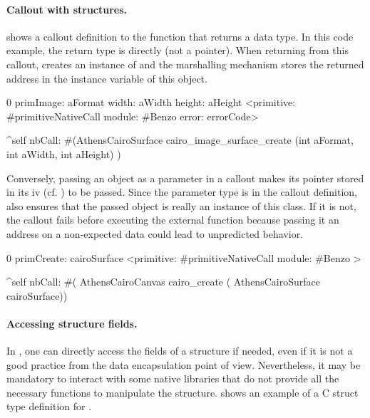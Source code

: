 \paragraph{Callout with structures.}
 shows a callout definition to the  function that returns a  data type.
In this code example, the return type is  directly (not a pointer).
When returning from this callout, \NB creates an instance of  and the marshalling mechanism  stores the returned address in the  instance variable of this object.

\begin{stcode}[
	label={lst:ffi-calloutOpaqueStruct},
	caption={Example of returning a structure by reference}]{0}
primImage: aFormat width: aWidth height: aHeight
	<primitive: #primitiveNativeCall
	 module: #Benzo
     error: errorCode>

	^self nbCall: #(AthensCairoSurface
		cairo_image_surface_create (int aFormat,
									int aWidth,
									int aHeight) )
\end{stcode}

Conversely, passing an  object as a parameter in a callout makes its pointer stored in its  iv (cf. ) to be passed.
Since the parameter type is  in the callout definition, \NB also ensures that the passed object is really an instance of this class.
If it is not, the callout fails before executing the external function because passing it an address on a non-expected data could lead to unpredicted behavior.

\begin{stcode}[
	label={lst:ffi-calloutOpaqueStructParameter},
	caption={Example of passing a structure by reference}]{0}
primCreate: cairoSurface
	<primitive: #primitiveNativeCall module: #Benzo >

	^self nbCall: #(
        AthensCairoCanvas cairo_create (
                  AthensCairoSurface cairoSurface))
\end{stcode}


\paragraph{Accessing structure fields.}
In \NB, one can directly access the fields of a structure if needed, even if it is not a good practice from the data encapsulation point of view.
Nevertheless, it may be mandatory to interact with some native libraries that do not provide all the necessary functions to manipulate the structure.
 shows an example of a C struct type definition for .

